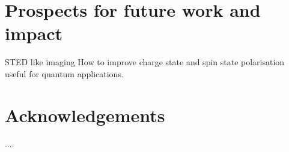 \documentclass[preprint,prl]{revtex4}
\begin{document}
\section{Prospects for future work and impact}
STED like imaging
How to improve charge state and spin state polarisation useful for quantum applications.


\section{}





%


\section*{Acknowledgements}

....

%
%
%




\begin{thebibliography}{27}






\end{thebibliography}
\end{document}
